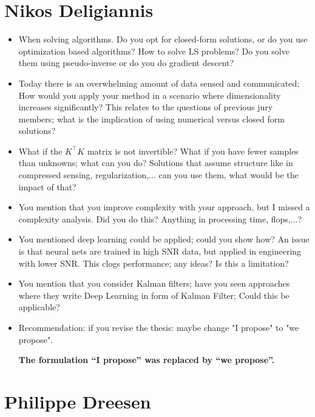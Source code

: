 \documentclass[11pt]{article}
\begin{document}
\section*{Nikos Deligiannis}

\begin{itemize}
	\item When solving algorithms. Do you opt for closed-form solutions, or do you use optimization based algorithms? How to solve LS problems? Do you solve them using pseudo-inverse or do you do gradient descent?
	\item  Today there is an overwhelming amount of data sensed and communicated; How would you apply your method in a scenario where dimensionality increases significantly? This relates to the questions of previous jury members; what is the implication of using numerical versus closed form solutions?
	\item  What if the $K^\top K$ matrix is not invertible? What if you have fewer samples than unknowns; what can you do? Solutions that assume structure like in compressed sensing, regularization,... can you use them, what would be the impact of that?
	\item  You mention that you improve complexity with your approach, but I missed a complexity analysis. Did you do this? Anything in processing time, flops,...?
	\item  You mentioned deep learning could be applied; could you show how? An issue is that neural nets are trained in high SNR data, but applied in engineering with lower SNR. This clogs performance; any ideas? Is this a limitation?
	\item  You mention that you consider Kalman filters; have you seen approaches where they write Deep Learning in form of Kalman Filter; Could this be applicable?
	\item  Recommendation: if you revise the thesis: maybe change "I propose" to "we propose".
	
	{\bfseries The formulation “I propose” was replaced by “we propose”. }
	
\end{itemize}

\section*{Philippe Dreesen}
\end{document}
